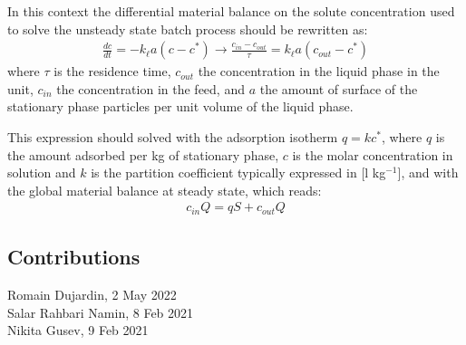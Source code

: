 \documentclass[letterpaper,10pt,english]{jupyterBook}
\begin{document}
\sphinxAtStartPar
In this context the  differential material balance on the solute concentration used to solve the unsteady state batch process should be rewritten as:
\begin{equation}\label{equation:Slurry_Adsorption:slurryeq12}
\begin{split}
\frac{dc}{dt}=-k_\ell{a}(c-c^*) \rightarrow \frac{{c_{in}-c_{out}}}{\tau}=k_\ell{a}(c_{out}-c^*)
\end{split}
\end{equation}
\sphinxAtStartPar
where \(\tau\) is the residence time, \(c_{out}\) the concentration in the liquid phase in the unit, \(c_{in}\) the concentration in the feed, and \(a\) the amount of surface of the stationary phase particles per unit volume of the liquid phase.

\sphinxAtStartPar
This expression should solved with the adsorption isotherm \(q=kc^*\), where \(q\) is the amount adsorbed per kg of stationary phase, \(c\) is the molar concentration in solution and \(k\) is the partition coefficient typically expressed in {[}l kg\(^{-1}\){]}, and with the global material balance at steady state, which reads:
\begin{equation}\label{equation:Slurry_Adsorption:slurryeq14}
\begin{split}
c_{in}Q=qS+c_{out}Q
\end{split}
\end{equation}

\subsection{Contributions}
\label{\detokenize{Slurry_Adsorption:contributions}}
\sphinxAtStartPar
Romain Dujardin, 2 May 2022\\
Salar Rahbari Namin, 8 Feb 2021\\
Nikita Gusev, 9 Feb 2021

\sphinxstepscope
\end{document}
